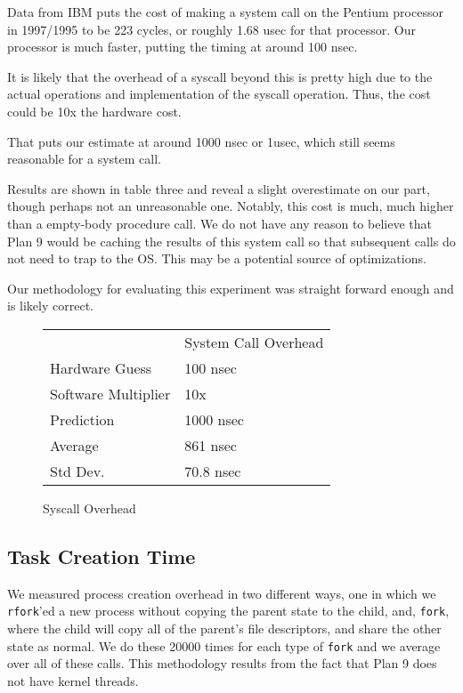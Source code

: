 \documentclass[letterpaper,twocolumn,10pt]{article}
\begin{document}
Data from IBM puts the cost of making a system call on the Pentium processor in 1997/1995
to be 223 cycles, or roughly 1.68 usec for that processor. Our processor is much faster,
putting the timing at around 100 nsec.

It is likely that the overhead of a syscall beyond this is pretty high due to
the actual operations and implementation of the syscall operation. Thus, the
cost could be 10x the hardware cost.

That puts our estimate at around 1000 nsec or 1usec, which still seems reasonable for a system call.

Results are shown in table three and reveal a slight overestimate on our part, though perhaps not an 
unreasonable one. Notably, this cost is much, much higher than a empty-body procedure call. We do not
have any reason to believe that Plan 9 would be caching the results of this system call so that subsequent
calls do not need to trap to the OS. This may be a potential source of optimizations.

Our methodology for evaluating this experiment was straight forward enough and is likely correct.

\begin{figure}
	\centering
    \begin{tabular}{ll}
            & System Call Overhead \\
    Hardware Guess  & 100 nsec  \\
    Software Multiplier  & 10x \\  
    Prediction  & 1000 nsec \\
    Average  & 861 nsec\\
    Std Dev. & 70.8 nsec          
    \end{tabular}
\caption{Syscall Overhead}
\label{tab:syscalloverheads}
\end{figure}

\subsection{Task Creation Time}

We measured process creation overhead in two different ways, one in which we
\texttt{rfork}'ed a new process without copying the parent state to the child,
and, \texttt{fork}, where the child will copy all of the parent's file
descriptors, and share the other state as normal. We do these 20000 times for
each type of \texttt{fork} and we average over all of these calls. This methodology
results from the fact that Plan 9 does not have kernel threads.
\end{document}
